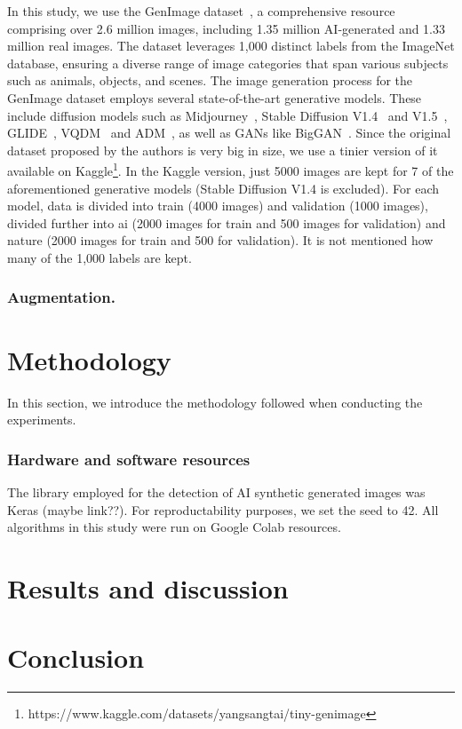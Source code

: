\documentclass[runningheads]{llncs}
\begin{document}
In this study, we use the GenImage dataset~\cite{zhu2023genimage}, a comprehensive resource comprising over 2.6 million images, including 1.35 million AI-generated and 1.33 million real images. The dataset leverages 1,000 distinct labels from the ImageNet database, ensuring a diverse range of image categories that span various subjects such as animals, objects, and scenes. The image generation process for the GenImage dataset employs several state-of-the-art generative models. These include diffusion models such as Midjourney~\cite{midjourney}, Stable Diffusion V1.4~\cite{robin2022sd} and V1.5~\cite{robin2022sd}, GLIDE~\cite{nichol2022glide}, VQDM~\cite{shuyang2022vqdm} and ADM~\cite{dhariwal2021adm}, as well as GANs like BigGAN~\cite{brock2019largescalegantraining}. Since the original dataset proposed by the authors is very big in size, we use a tinier version of it available on Kaggle\footnote{https://www.kaggle.com/datasets/yangsangtai/tiny-genimage}. In the Kaggle version, just 5000 images are kept for 7 of the aforementioned generative models (Stable Diffusion V1.4 is excluded). For each model, data is divided into train (4000 images) and validation (1000 images), divided further into ai (2000 images for train and 500 images for validation) and nature (2000 images for train and 500 for validation). It is not mentioned how many of the 1,000 labels are kept. 


\subsubsection{Augmentation.}
%
%
\section{Methodology}

In this section, we introduce the methodology followed when conducting the experiments. 

\subsubsection{Hardware and software resources} The library employed for the detection of AI synthetic generated images was Keras (maybe link??). For reproductability purposes, we set the seed to 42. All algorithms in this study were run on Google Colab resources.

%
%
\section{Results and discussion}

%
%
\section{Conclusion}


%
%
%


\end{document}
